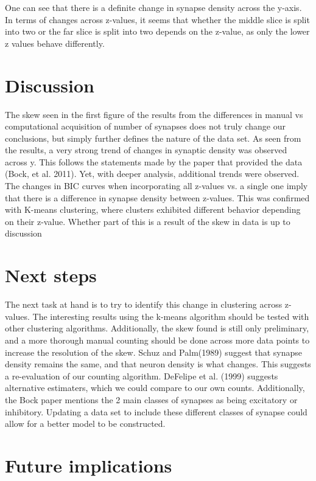 \documentclass{article}
\begin{document}
One can see that there is a definite change in synapse density across the y-axis. In terms of changes across z-values, it seems that whether the middle slice is split into two or the far slice is split into two depends on the z-value, as only the lower z values behave differently.

\section{Discussion}

The skew seen in the first figure of the results from the differences in manual vs computational acquisition of number of synapses does not truly change our conclusions, but simply further defines the nature of the data set. As seen from the results, a very strong trend of changes in synaptic density was observed across y. This follows the statements made by the paper that provided the data (Bock, et al. 2011). Yet, with deeper analysis, additional trends were observed. The changes in BIC curves when incorporating all z-values vs. a single one imply that there is a difference in synapse density between z-values. This was confirmed with K-means clustering, where clusters exhibited different behavior depending on their z-value. Whether part of this is a result of the skew in data is up to discussion

\section{Next steps}

The next task at hand is to try to identify this change in clustering across z-values. The interesting results using the k-means algorithm should be tested with other clustering algorithms. Additionally, the skew found is still only preliminary, and a more thorough manual counting should be done across more data points to increase the resolution of the skew. Schuz and Palm(1989) suggest that synapse density remains the same, and that neuron density is what changes. This suggests a re-evaluation of our counting algorithm. DeFelipe et al. (1999) suggests alternative estimaters, which we could compare to our own counts. Additionally, the Bock paper mentions the 2 main classes of synapses as being excitatory or inhibitory. Updating a data set to include these different classes of synapse could allow for a better model to be constructed.

\section{Future implications}
\end{document}
